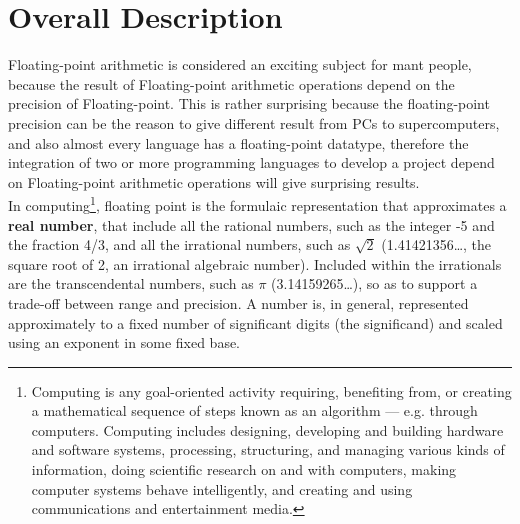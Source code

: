 \documentclass[11pt]{article}
\begin{document}
\section{Overall Description}%
Floating-point arithmetic is considered an exciting subject for mant people, because the result of Floating-point arithmetic operations depend on the precision of Floating-point. This is rather surprising because the floating-point precision can be the reason to give different result from PCs to supercomputers, and also almost every language has a floating-point datatype, therefore the integration of two or more programming languages to develop a project depend on Floating-point arithmetic operations  will give surprising results.\\

In computing\footnote{Computing is any goal-oriented activity requiring, benefiting from, or creating a mathematical sequence of steps known as an algorithm — e.g. through computers. Computing includes designing, developing and building hardware and software systems, processing, structuring, and managing various kinds of information, doing scientific research on and with computers, making computer systems behave intelligently, and creating and using communications and entertainment media.}, floating point is the formulaic representation that approximates a \textbf{real number}, that include all the rational numbers, such as the integer -5 and the fraction 4/3, and all the irrational numbers, such as $\sqrt{2}$ (1.41421356…, the square root of 2, an irrational algebraic number). Included within the irrationals are the transcendental numbers, such as $\pi$ (3.14159265…), so as to support a trade-off between range and precision. A number is, in general, represented approximately to a fixed number of significant digits (the significand) and scaled using an exponent in some fixed base.\\
\end{document}
